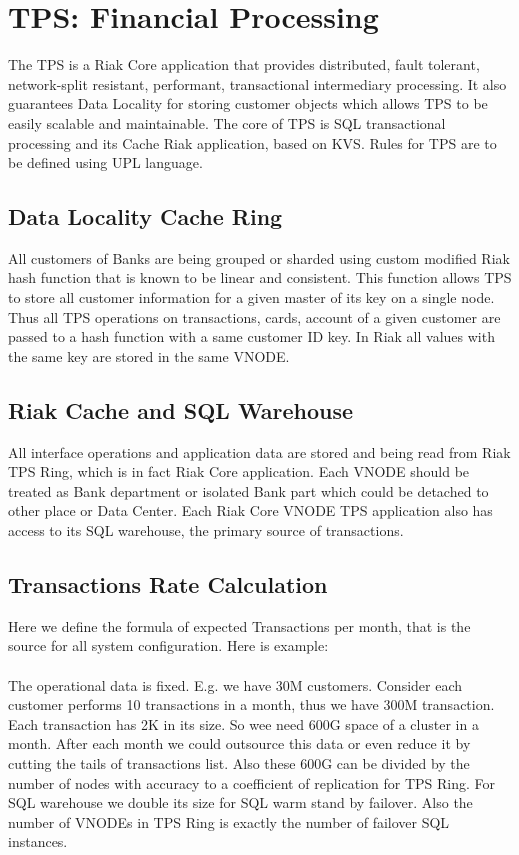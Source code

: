 \section{TPS: Financial Processing}

The TPS is a Riak Core application that provides distributed,
fault tolerant, network-split resistant, performant,
transactional intermediary processing. It also guarantees
Data Locality for storing customer objects which allows
TPS to be easily scalable and maintainable. The core of TPS
is SQL transactional processing and its Cache Riak application,
based on KVS. Rules for TPS are to be defined using UPL language.

\subsection{Data Locality Cache Ring}

All customers of Banks are being grouped or sharded using custom
modified Riak hash function that is known to be linear and consistent.
This function allows TPS to store all customer information for
a given master of its key on a single node. Thus all TPS operations
on transactions, cards, account of a given customer are passed
to a hash function with a same customer ID key.
In Riak all values with the same key are stored in the same VNODE.

\subsection{Riak Cache and SQL Warehouse}

All interface operations and application data are stored and
being read from Riak TPS Ring, which is in fact Riak Core application.
Each VNODE should be treated as Bank department or isolated Bank part
which could be detached to other place or Data Center.
Each Riak Core VNODE TPS application also has access to its SQL warehouse,
the primary source of transactions.

\subsection{Transactions Rate Calculation}

Here we define the formula of expected Transactions per month,
that is the source for all system configuration. Here is example:

\paragraph{}
The operational data is fixed. E.g. we have 30M customers.
Consider each customer performs 10 transactions in a month,
thus we have 300M transaction. Each transaction has 2K in its size.
So wee need 600G space of a cluster in a month.
After each month we could outsource this data or even reduce it
by cutting the tails of transactions list. Also these 600G can be divided
by the number of nodes with accuracy to a coefficient of replication for TPS Ring.
For SQL warehouse we double its size for SQL warm stand by failover.
Also the number of VNODEs in TPS Ring is exactly the number of failover SQL instances.

